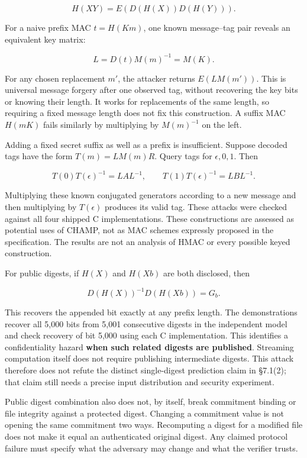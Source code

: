 \documentclass[
  english,
  11pt,
  a4paper,
]{article}
\begin{document}
\[
H(XY)=E(D(H(X))D(H(Y))).
\]


For a naive prefix MAC \(t=H(Km)\), one known message--tag pair reveals
an equivalent key matrix:

\[
L=D(t)M(m)^{-1}=M(K).
\]

For any chosen replacement \(m'\), the attacker returns \(E(LM(m'))\).
This is universal message forgery after one observed tag, without
recovering the key bits or knowing their length. It works for
replacements of the same length, so requiring a fixed message length
does not fix this construction. A suffix MAC \(H(mK)\) fails similarly
by multiplying by \(M(m)^{-1}\) on the left.


Adding a fixed secret suffix as well as a prefix is insufficient.
Suppose decoded tags have the form \(T(m)=L M(m)R\). Query tags for
\(\epsilon,0,1\). Then

\[
T(0)T(\epsilon)^{-1}=LAL^{-1},\qquad
T(1)T(\epsilon)^{-1}=LBL^{-1}.
\]

Multiplying these known conjugated generators according to a new message
and then multiplying by \(T(\epsilon)\) produces its valid tag. These
attacks were checked against all four shipped C implementations. These
constructions are assessed as potential uses of CHAMP, not as MAC
schemes expressly proposed in the specification. The results are not an
analysis of HMAC or every possible keyed construction.


For public digests, if \(H(X)\) and \(H(Xb)\) are both disclosed, then

\[
D(H(X))^{-1}D(H(Xb))=G_b.
\]

This recovers the appended bit exactly at any prefix length. The
demonstrations recover all 5,000 bits from 5,001 consecutive digests in
the independent model and check recovery of bit 5,000 using each C
implementation. This identifies a confidentiality hazard \textbf{when
such related digests are published}. Streaming computation itself does
not require publishing intermediate digests. This attack therefore does
not refute the distinct single-digest prediction claim in §7.1(2); that
claim still needs a precise input distribution and security experiment.

Public digest combination also does not, by itself, break commitment
binding or file integrity against a protected digest. Changing a
commitment value is not opening the same commitment two ways.
Recomputing a digest for a modified file does not make it equal an
authenticated original digest. Any claimed protocol failure must specify
what the adversary may change and what the verifier trusts.
\end{document}
